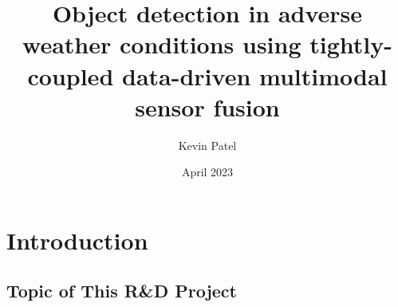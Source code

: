 \documentclass[rnd]{mas_proposal}
\title{Object detection in adverse weather conditions using tightly-coupled data-driven multimodal sensor fusion}
\author{Kevin Patel}
\date{April 2023}
\begin{document}
\maketitle

\pagestyle{plain}

\section{Introduction}

\subsection{Topic of This R\&D Project}
\begin{itemize}






\end{itemize}
\end{document}
